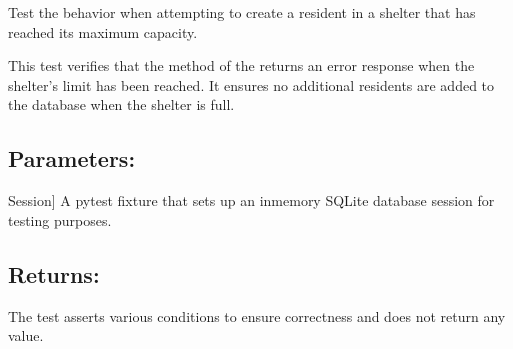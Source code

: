 \documentclass[letterpaper,10pt,english]{sphinxmanual}
\begin{document}
\begin{fulllineitems}
\label{\detokenize{test:test.test_residetnt.test_create_resident_shelter_full}}
\pysigstartsignatures
\pysiglinewithargsret
{}
{}
{}
\pysigstopsignatures
\sphinxAtStartPar
Test the behavior when attempting to create a resident in a shelter that has reached its maximum capacity.

\sphinxAtStartPar
This test verifies that the  method of the 
returns an error response when the shelter’s  limit has been reached.
It ensures no additional residents are added to the database when the shelter is full.


\subsection{Parameters:}
\label{\detokenize{test:id5}}\begin{description}
\sphinxlineitem{setup\_database}{[}Session{]}
\sphinxAtStartPar
A pytest fixture that sets up an in\sphinxhyphen{}memory SQLite database session
for testing purposes.

\end{description}


\subsection{Returns:}
\label{\detokenize{test:id6}}\begin{description}
\sphinxAtStartPar
The test asserts various conditions to ensure correctness and does not
return any value.

\end{description}

\end{fulllineitems}

\end{document}

